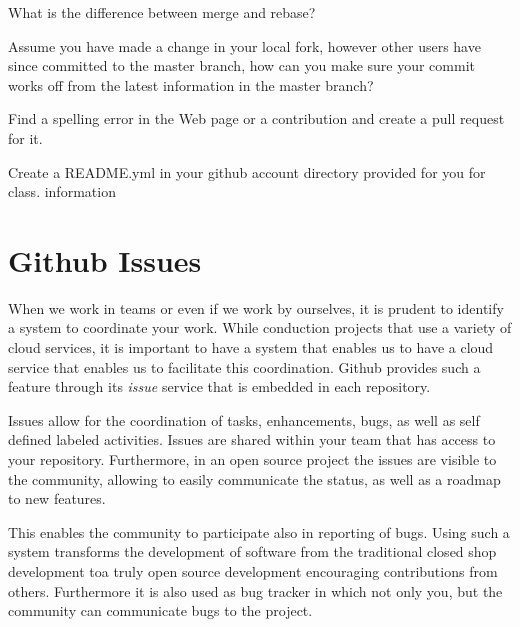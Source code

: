\begin{exercise}
\label{E:Github.2} What is the difference between merge and rebase?
\end{exercise}

\begin{exercise}
\label{E:Github.3} Assume you have made a change in your local fork,
  however other users have since committed to the master branch, how
  can you make sure your commit works off from the latest information
  in the master branch?
\end{exercise}

\begin{exercise}
\label{E:Github.4} Find a spelling error in the Web page or a
  contribution and create a pull request for it.
\end{exercise}

\begin{exercise}
\label{E:Gitlab.5} Create a README.yml in your github account directory
  provided for you for class.  information
\end{exercise}



\section{Github Issues}\label{S:git-issues}

When we work in teams or even if we work by ourselves, it is prudent to
identify a system to coordinate your work. While conduction projects
that use a variety of cloud services, it is important to have a system
that enables us to have a cloud service that enables us to facilitate
this coordination. Github provides such a feature through its {\em
  issue} service that is embedded in each repository. 


Issues allow for the coordination of tasks, enhancements, bugs, as
well as self defined labeled activities. Issues are shared within your
team that has access to your repository. Furthermore, in an open
source project the issues are visible to the community, allowing to
easily communicate the status, as well as a roadmap to new features. 

This enables the community to participate also in reporting of
bugs. Using such a system transforms the development of software from
the traditional closed shop development toa truly open source
development encouraging contributions from others. Furthermore it is
also used as bug tracker in which not only you, but the community can
communicate bugs to the project.

